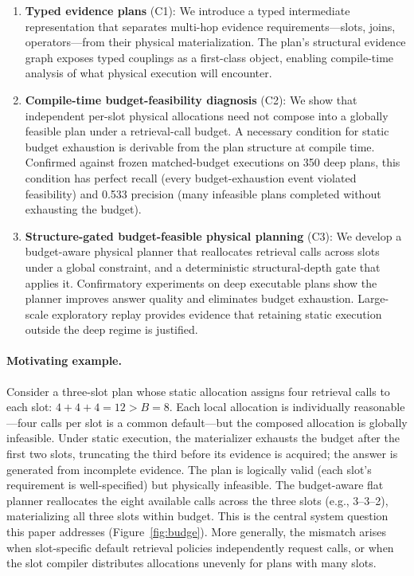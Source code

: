 \begin{enumerate}
\item \textbf{Typed evidence plans} (C1): We introduce a typed intermediate representation that separates multi-hop evidence requirements---slots, joins, operators---from their physical materialization. The plan's structural evidence graph exposes typed couplings as a first-class object, enabling compile-time analysis of what physical execution will encounter.

\item \textbf{Compile-time budget-feasibility diagnosis} (C2): We show that independent per-slot physical allocations need not compose into a globally feasible plan under a retrieval-call budget. A necessary condition for static budget exhaustion is derivable from the plan structure at compile time. Confirmed against frozen matched-budget executions on 350 deep plans, this condition has perfect recall (every budget-exhaustion event violated feasibility) and 0.533 precision (many infeasible plans completed without exhausting the budget).

\item \textbf{Structure-gated budget-feasible physical planning} (C3): We develop a budget-aware physical planner that reallocates retrieval calls across slots under a global constraint, and a deterministic structural-depth gate that applies it. Confirmatory experiments on deep executable plans show the planner improves answer quality and eliminates budget exhaustion. Large-scale exploratory replay provides evidence that retaining static execution outside the deep regime is justified.
\end{enumerate}

\paragraph{Motivating example.}
Consider a three-slot plan whose static allocation assigns four retrieval calls to each slot: $4 + 4 + 4 = 12 > B = 8$. Each local allocation is individually reasonable---four calls per slot is a common default---but the composed allocation is globally infeasible. Under static execution, the materializer exhausts the budget after the first two slots, truncating the third before its evidence is acquired; the answer is generated from incomplete evidence. The plan is logically valid (each slot's requirement is well-specified) but physically infeasible. The budget-aware flat planner reallocates the eight available calls across the three slots (e.g., 3--3--2), materializing all three slots within budget. This is the central system question this paper addresses (Figure~\ref{fig:budge}). More generally, the mismatch arises when slot-specific default retrieval policies independently request calls, or when the slot compiler distributes allocations unevenly for plans with many slots.

